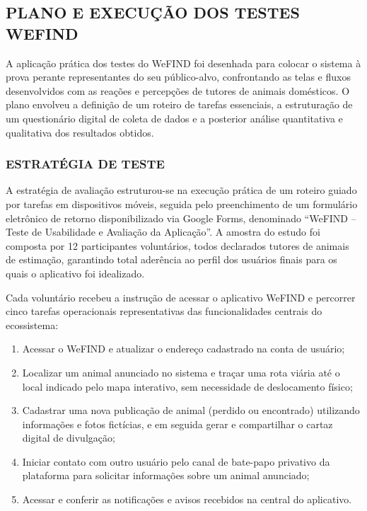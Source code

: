 \subsection{PLANO E EXECUÇÃO DOS TESTES WEFIND}

A aplicação prática dos testes do WeFIND foi desenhada para colocar o sistema à prova perante representantes do seu público-alvo, confrontando as telas e fluxos desenvolvidos com as reações e percepções de tutores de animais domésticos. O plano envolveu a definição de um roteiro de tarefas essenciais, a estruturação de um questionário digital de coleta de dados e a posterior análise quantitativa e qualitativa dos resultados obtidos.

\subsubsection{ESTRATÉGIA DE TESTE}

A estratégia de avaliação estruturou-se na execução prática de um roteiro guiado por tarefas em dispositivos móveis, seguida pelo preenchimento de um formulário eletrônico de retorno disponibilizado via Google Forms, denominado ``WeFIND -- Teste de Usabilidade e Avaliação da Aplicação''. A amostra do estudo foi composta por 12 participantes voluntários, todos declarados tutores de animais de estimação, garantindo total aderência ao perfil dos usuários finais para os quais o aplicativo foi idealizado.

Cada voluntário recebeu a instrução de acessar o aplicativo WeFIND e percorrer cinco tarefas operacionais representativas das funcionalidades centrais do ecossistema:

\begin{enumerate}
    \item Acessar o WeFIND e atualizar o endereço cadastrado na conta de usuário;
    \item Localizar um animal anunciado no sistema e traçar uma rota viária até o local indicado pelo mapa interativo, sem necessidade de deslocamento físico;
    \item Cadastrar uma nova publicação de animal (perdido ou encontrado) utilizando informações e fotos fictícias, e em seguida gerar e compartilhar o cartaz digital de divulgação;
    \item Iniciar contato com outro usuário pelo canal de bate-papo privativo da plataforma para solicitar informações sobre um animal anunciado;
    \item Acessar e conferir as notificações e avisos recebidos na central do aplicativo.
\end{enumerate}

